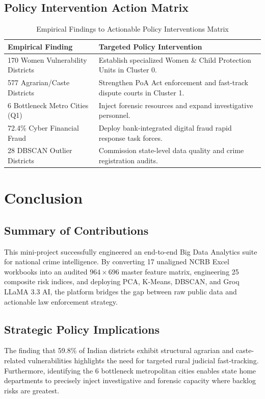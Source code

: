 \documentclass[12pt,a4paper]{report}
\begin{document}
\section{Policy Intervention Action Matrix}
\begin{table}[h]
\centering
\small
\caption{Empirical Findings to Actionable Policy Interventions Matrix}
\begin{tabular}{lp{8cm}}
\toprule
\textbf{Empirical Finding} & \textbf{Targeted Policy Intervention} \\
\midrule
170 Women Vulnerability Districts & Establish specialized Women \& Child Protection Units in Cluster 0. \\
577 Agrarian/Caste Districts & Strengthen PoA Act enforcement and fast-track dispute courts in Cluster 1. \\
6 Bottleneck Metro Cities (Q1) & Inject forensic resources and expand investigative personnel. \\
72.4\% Cyber Financial Fraud & Deploy bank-integrated digital fraud rapid response task forces. \\
28 DBSCAN Outlier Districts & Commission state-level data quality and crime registration audits. \\
\bottomrule
\end{tabular}
\end{table}

\chapter{Conclusion}

\section{Summary of Contributions}
This mini-project successfully engineered an end-to-end Big Data Analytics suite for national crime intelligence. By converting 17 unaligned NCRB Excel workbooks into an audited $964 \times 696$ master feature matrix, engineering 25 composite risk indices, and deploying PCA, K-Means, DBSCAN, and Groq LLaMA 3.3 AI, the platform bridges the gap between raw public data and actionable law enforcement strategy.

\section{Strategic Policy Implications}
The finding that 59.8\% of Indian districts exhibit structural agrarian and caste-related vulnerabilities highlights the need for targeted rural judicial fast-tracking. Furthermore, identifying the 6 bottleneck metropolitan cities enables state home departments to precisely inject investigative and forensic capacity where backlog risks are greatest.
\end{document}
